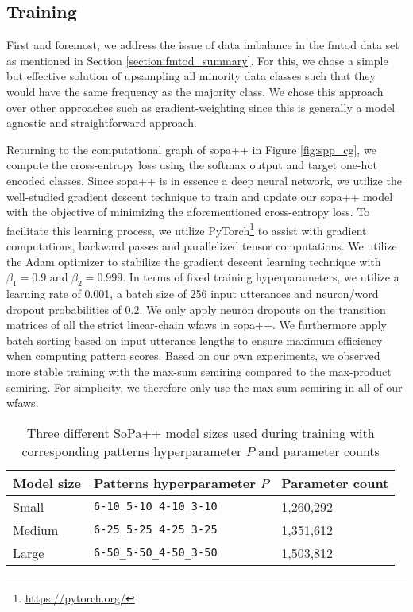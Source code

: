 \subsection{Training}

\label{section:spp_training}

First and foremost, we address the issue of data imbalance in the \ac{fmtod} data set
as mentioned in Section \ref{section:fmtod_summary}. For this, we chose a simple
but effective solution of upsampling all minority data classes such that they
would have the same frequency as the majority class. We chose this approach over
other approaches such as gradient-weighting since this is generally a model
agnostic and straightforward approach.

Returning to the computational graph of \ac{sopa}++ in Figure \ref{fig:spp_cg}, we
compute the cross-entropy loss using the softmax output and target one-hot
encoded classes. Since \ac{sopa}++ is in essence a deep neural network, we utilize
the well-studied gradient descent technique to train and update our \ac{sopa}++ model
with the objective of minimizing the aforementioned cross-entropy loss. To
facilitate this learning process, we utilize
PyTorch\footnote{\url{https://pytorch.org/}} to assist with gradient computations,
backward passes and parallelized tensor computations. We utilize the Adam
optimizer \citep{DBLP:journals/corr/KingmaB14} to stabilize the gradient descent
learning technique with $\beta_1=0.9$ and $\beta_2=0.999$. In terms of fixed
training hyperparameters, we utilize a learning rate of 0.001, a batch size of
256 input utterances and neuron/word dropout probabilities of 0.2. We only apply
neuron dropouts on the transition matrices of all the strict linear-chain
\ac{wfaws} in \ac{sopa}++. We furthermore apply batch sorting based on input
utterance lengths to ensure maximum efficiency when computing pattern
scores. Based on our own experiments, we observed more stable training with the
max-sum semiring compared to the max-product semiring. For simplicity, we
therefore only use the max-sum semiring in all of our \ac{wfaws}.

\begin{table}[t!]
  \centering
  \begin{tabular}{lll}
    \toprule
    Model size & Patterns hyperparameter $P$ & Parameter count \\
    \midrule
    Small & \texttt{6-10\_5-10\_4-10\_3-10} & 1,260,292 \\
    Medium & \texttt{6-25\_5-25\_4-25\_3-25} & 1,351,612  \\
    Large & \texttt{6-50\_5-50\_4-50\_3-50} & 1,503,812 \\
    \bottomrule
  \end{tabular}
  \caption{Three different SoPa++ model sizes used during training with
    corresponding patterns hyperparameter $P$ and parameter counts}
  \label{tab:model_types}
\end{table}

